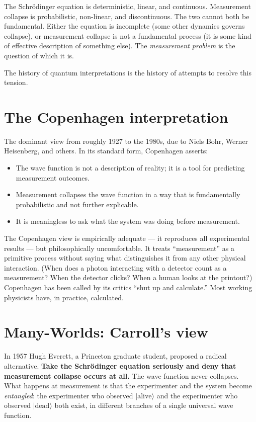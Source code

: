 \documentclass[11pt,a4paper]{book}
\theoremstyle{cleanrm}
\begin{document}
\begin{conceptbox}
The Schr\"odinger equation is deterministic, linear, and continuous.
Measurement collapse is probabilistic, non-linear, and discontinuous.
The two cannot both be fundamental. Either the equation is incomplete
(some other dynamics governs collapse), or measurement collapse is
not a fundamental process (it is some kind of effective description of
something else). The \emph{measurement problem} is the question of
which it is.
\end{conceptbox}

The history of quantum interpretations is the history of attempts to
resolve this tension.

\section{The Copenhagen interpretation}

The dominant view from roughly 1927 to the 1980s, due to Niels Bohr,
Werner Heisenberg, and others. In its standard form, Copenhagen
asserts:

\begin{itemize}[leftmargin=2em]
    \item The wave function is not a description of reality; it is a
    tool for predicting measurement outcomes.
    \item Measurement collapses the wave function in a way that is
    fundamentally probabilistic and not further explicable.
    \item It is meaningless to ask what the system was doing before
    measurement.
\end{itemize}

The Copenhagen view is empirically adequate --- it reproduces all
experimental results --- but philosophically uncomfortable. It treats
``measurement'' as a primitive process without saying what
distinguishes it from any other physical interaction. (When does a
photon interacting with a detector count as a measurement? When the
detector clicks? When a human looks at the printout?) Copenhagen has
been called by its critics ``shut up and calculate.'' Most working
physicists have, in practice, calculated.

\section{Many-Worlds: Carroll's view}

In 1957 Hugh Everett, a Princeton graduate student, proposed a radical
alternative. \textbf{Take the Schr\"odinger equation seriously and
deny that measurement collapse occurs at all.} The wave function never
collapses. What happens at measurement is that the experimenter and the
system become \emph{entangled}: the experimenter who observed
$|\text{alive}\rangle$ and the experimenter who observed
$|\text{dead}\rangle$ both exist, in different branches of a single
universal wave function.
\end{document}
